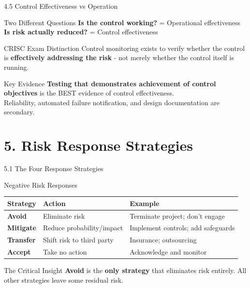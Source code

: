 \documentclass{beamer}
\begin{document}
	\begin{frame}{4.5 Control Effectiveness vs Operation}
		\begin{block}{Two Different Questions}
			\textbf{Is the control working?} = Operational effectiveness \\
			\textbf{Is risk actually reduced?} = Control effectiveness
		\end{block}
		
		\begin{alertblock}{CRISC Exam Distinction}
			Control monitoring exists to verify whether the control is \textbf{effectively addressing the risk} - not merely whether the control itself is running.
		\end{alertblock}
		
		\begin{exampleblock}{Key Evidence}
			\textbf{Testing that demonstrates achievement of control objectives} is the BEST evidence of control effectiveness. \\
			Reliability, automated failure notification, and design documentation are secondary.
		\end{exampleblock}
	\end{frame}
	
	\section{5. Risk Response Strategies}
	
	\begin{frame}{5.1 The Four Response Strategies}
		\begin{block}{Negative Risk Responses}
			\begin{tabular}{|p{2.5cm}|p{4cm}|p{5cm}|}
				\hline
				\textbf{Strategy} & \textbf{Action} & \textbf{Example} \\
				\hline
				\textbf{Avoid} & Eliminate risk & Terminate project; don't engage \\
				\hline
				\textbf{Mitigate} & Reduce probability/impact & Implement controls; add safeguards \\
				\hline
				\textbf{Transfer} & Shift risk to third party & Insurance; outsourcing \\
				\hline
				\textbf{Accept} & Take no action & Acknowledge and monitor \\
				\hline
			\end{tabular}
		\end{block}
		
		\begin{alertblock}{The Critical Insight}
			\textbf{Avoid} is the \textbf{only strategy} that eliminates risk entirely. All other strategies leave some residual risk.
		\end{alertblock}
	\end{frame}
	
\end{document}
